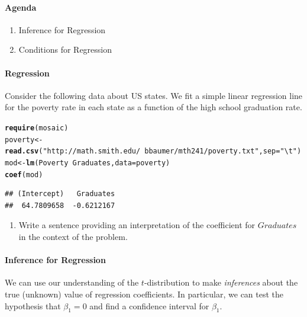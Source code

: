\documentclass[10pt]{article}\usepackage[]{graphicx}\usepackage[]{color}
\makeatletter
\newcommand{\hlstr}[1]{\textcolor[rgb]{0.192,0.494,0.8}{#1}}%
\newcommand{\hlopt}[1]{\textcolor[rgb]{0,0,0}{#1}}%
\newcommand{\hlstd}[1]{\textcolor[rgb]{0.345,0.345,0.345}{#1}}%
\newcommand{\hlkwb}[1]{\textcolor[rgb]{0.69,0.353,0.396}{#1}}%
\newcommand{\hlkwc}[1]{\textcolor[rgb]{0.333,0.667,0.333}{#1}}%
\newcommand{\hlkwd}[1]{\textcolor[rgb]{0.737,0.353,0.396}{\textbf{#1}}}%
\newenvironment{kframe}{%
 \def\at@end@of@kframe{}%
 \ifinner\ifhmode%
  \def\at@end@of@kframe{\end{minipage}}%
  \begin{minipage}{\columnwidth}%
 \fi\fi%
 \def\FrameCommand##1{\hskip\@totalleftmargin \hskip-\fboxsep
 \colorbox{shadecolor}{##1}\hskip-\fboxsep
     \hskip-\linewidth \hskip-\@totalleftmargin \hskip\columnwidth}%
 \MakeFramed {\advance\hsize-\width
   \@totalleftmargin\z@ \linewidth\hsize
   \@setminipage}}%
 {\par\unskip\endMakeFramed%
 \at@end@of@kframe}
\newenvironment{knitrout}{}{} %
\makeatother
\begin{document}
\paragraph{Agenda}
\begin{enumerate}
  \itemsep0em
  \item Inference for Regression
  \item Conditions for Regression
\end{enumerate}

\paragraph{Regression}

Consider the following data about US states. We fit a simple linear regression line for the poverty rate in each state as a function of the high school graduation rate. 

\begin{knitrout}\footnotesize
{}\color{fgcolor}\begin{kframe}
\begin{alltt}
\hlkwd{require}\hlstd{(mosaic)}
\hlstd{poverty} \hlkwb{<-} \hlkwd{read.csv}\hlstd{(}\hlstr{"http://math.smith.edu/~bbaumer/mth241/poverty.txt"}\hlstd{,} \hlkwc{sep} \hlstd{=} \hlstr{"\textbackslash{}t"}\hlstd{)}
\hlstd{mod} \hlkwb{<-} \hlkwd{lm}\hlstd{(Poverty} \hlopt{~} \hlstd{Graduates,} \hlkwc{data} \hlstd{= poverty)}
\hlkwd{coef}\hlstd{(mod)}
\end{alltt}
\begin{verbatim}
## (Intercept)   Graduates 
##  64.7809658  -0.6212167
\end{verbatim}
\end{kframe}
\end{knitrout}

\begin{enumerate}
  \item Write a sentence providing an interpretation of the coefficient for $Graduates$ in the context of the problem. 
  \vspace{0.5in}
\end{enumerate}

\paragraph{Inference for Regression}

We can use our understanding of the $t$-distribution to make \emph{inferences} about the true (unknown) value of regression coefficients. In particular, we can test the hypothesis that $\beta_1 = 0$ and find a confidence interval for $\beta_1$. 
\end{document}
